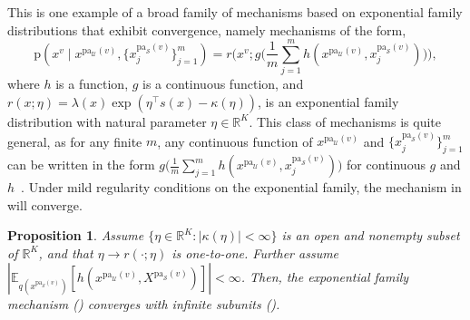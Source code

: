 \documentclass[12pt]{article}
\newtheorem{proposition}{Proposition}
\newcommand{\pa}{\mathrm{pa}}
\newcommand{\pr}{\mathrm{p}}
\begin{document}
This is one example of a broad family of mechanisms based on exponential family distributions that exhibit convergence, namely mechanisms of the form,
\begin{equation} \label{eqn:exp-family-mechanism}
        \pr(x^v \mid x^{\pa_\mathcal{U}(v)}, \{x_{j}^{\pa_\mathcal{S}(v)}\}_{j=1}^m) = r\Big(x^v ; g\Big (\frac{1}{m}\sum_{j=1}^m h(x^{\pa_\mathcal{U}(v)}, x_{j}^{\pa_\mathcal{S}(v)})\Big)\Big),
\end{equation}
where $h$ is a function, $g$ is a continuous function, and
$r(x ; \eta) = \lambda(x) \exp(\eta^\top s(x) - \kappa(\eta))$,
is an exponential family distribution with natural parameter $\eta \in \mathbb{R}^K$.
This class of mechanisms is quite general, as for any finite $m$, any continuous function of $x^{\pa_\mathcal{U}(v)}$ and $\{x_{j}^{\pa_\mathcal{S}(v)}\}_{j=1}^m$ can be written in the form $g\big(\frac{1}{m}\sum_{j=1}^m h(x^{\pa_\mathcal{U}(v)}, x_{j}^{\pa_\mathcal{S}(v)})\big)$ for continuous $g$ and $h$~\citep[Theorem 7]{Zaheer2017-vs}.
Under mild regularity conditions on the exponential family, the mechanism in  will converge.
\begin{proposition}
         Assume $\{\eta \in \mathbb{R}^K: |\kappa(\eta)| < \infty\}$ is an open and nonempty subset of $\mathbb{R}^K$, and that $\eta \to r(\cdot ; \eta)$ is one-to-one.
        Further assume $|\mathbb{E}_{q(x^{\pa_\mathcal{S}(v)})}[h(x^{\pa_\mathcal{U}(v)}, X^{\pa_\mathcal{S}(v)})]| < \infty$. Then, the exponential family mechanism () converges with infinite subunits ().
\end{proposition}
\end{document}
